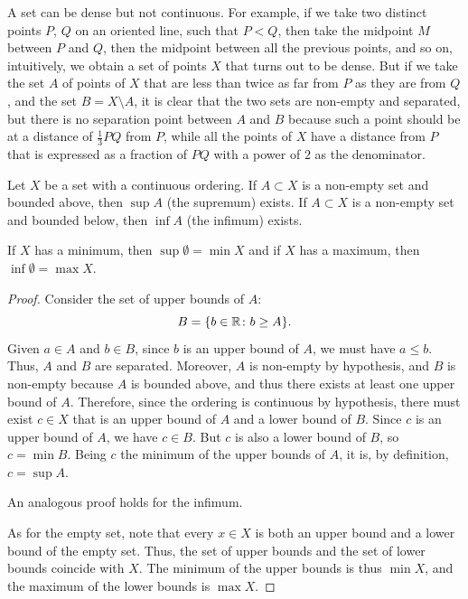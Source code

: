 \begin{example}
A set can be dense but not continuous. 
For example, if we take two distinct points $P$, $Q$ on an oriented line, such
that $P<Q$, then take the midpoint $M$ between $P$ and $Q$, then the midpoint
between all the previous points, and so on, intuitively, we obtain a set of
points $X$ that turns out to be dense. But if we take the set $A$ of points of
$X$ that are less than twice as far from $P$ as they are from $Q$, and the set
$B=X\setminus A$, it is clear that the two sets are non-empty and separated, but
there is no separation point between $A$ and $B$ because such a point should be
at a distance of $\frac 1 3 PQ$ from $P$, while all the points of $X$ have a
distance from $P$ that is expressed as a fraction of $PQ$ with a power of $2$ as
the denominator.
\end{example}


\begin{theorem}%
  \label{th:sup}%
  \mymark{**}%
  Let $X$ be a set with a continuous ordering.
  If $A\subset X$ is a non-empty set
  and bounded above, then $\sup A$ (the supremum) exists.
  If $A\subset X$ is a non-empty set and bounded below, 
  then $\inf A$ (the infimum) exists.

  If $X$ has a minimum, then $\sup\emptyset = \min X$
  and if $X$ has a maximum, then $\inf\emptyset = \max X$.
  \end{theorem}
  \begin{proof}
  \mymark{*}
  Consider the set of upper bounds of $A$:
  \[
  B = {\left\{  b\in {\mathbb R} \colon b \ge A \right\}}.
  \]
  Given $a\in A$ and $b\in B$, since $b$ is an upper bound of $A$,
  we must have $a\le b$. Thus, $A$ and $B$ are separated.
  Moreover, $A$ is non-empty by hypothesis, and $B$ is non-empty because 
  $A$ is bounded above, and thus there exists at least one upper bound of $A$.
  Therefore, since the ordering is continuous by hypothesis,
    there must exist $c\in X$ that is an upper bound of $A$ and a lower bound of
  $B$.
  Since $c$ is an upper bound of $A$, we have $c\in B$.
  But $c$ is also a lower bound of $B$, so $c=\min B$.
  Being $c$ the minimum of the upper bounds of $A$, it is, by definition,
  $c= \sup A$.

  An analogous proof holds for the infimum.

  As for the empty set, note that every $x\in X$ 
  is both an upper bound and a lower bound of the empty set.
  Thus, the set of upper bounds and the set of lower bounds coincide with $X$.
    The minimum of the upper bounds is thus $\min X$, and the maximum of the
  lower bounds is $\max X$.
\end{proof}

